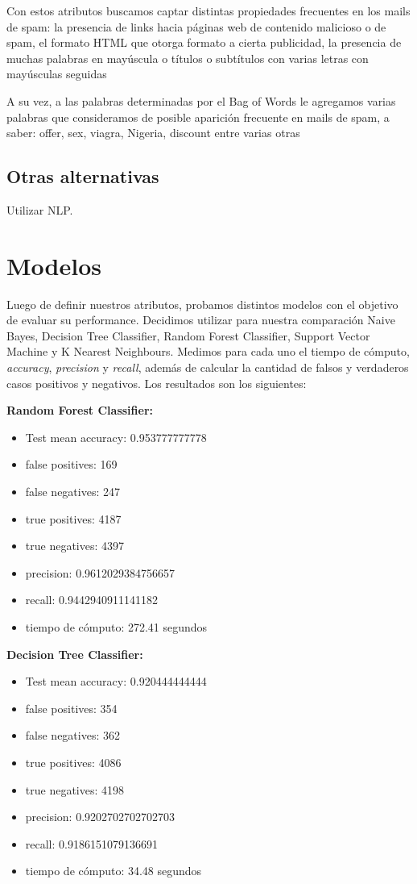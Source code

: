 \documentclass[10pt,a4paper]{article}
\begin{document}
Con estos atributos buscamos captar distintas propiedades frecuentes en los mails de spam: la presencia de links hacia páginas web de contenido malicioso o de spam, el formato HTML que otorga formato a cierta publicidad, la presencia de muchas palabras en mayúscula o títulos o subtítulos con varias letras con mayúsculas seguidas

A su vez, a las palabras determinadas por el Bag of Words le agregamos varias palabras que consideramos de posible aparición frecuente en mails de spam, a saber: offer, sex, viagra, Nigeria, discount entre varias otras

\subsection{Otras alternativas}

Utilizar NLP.

\section{Modelos}

Luego de definir nuestros atributos, probamos distintos modelos con el objetivo de evaluar su performance. Decidimos utilizar para nuestra comparación Naive Bayes, Decision Tree Classifier, Random Forest Classifier, Support Vector Machine y K Nearest Neighbours. Medimos para cada uno el tiempo de cómputo, \textit{accuracy}, \textit{precision} y \textit{recall}, además de calcular la cantidad de falsos y verdaderos casos positivos y negativos. Los resultados son los siguientes:

\textbf{Random Forest Classifier:}
\begin{itemize}
	\item Test mean accuracy: 0.953777777778
	\item false positives: 169
	\item false negatives: 247
	\item true positives: 4187
	\item true negatives: 4397
	\item precision: 0.9612029384756657
	\item recall: 0.9442940911141182
	\item tiempo de cómputo: 272.41 segundos
\end{itemize}

\textbf{Decision Tree Classifier:}
\begin{itemize}
	\item Test mean accuracy: 0.920444444444
	\item false positives: 354
	\item false negatives: 362
	\item true positives:  4086
	\item true negatives:  4198
	\item precision: 0.9202702702702703
	\item recall: 0.9186151079136691
	\item tiempo de cómputo: 34.48 segundos
\end{itemize}
\end{document}
